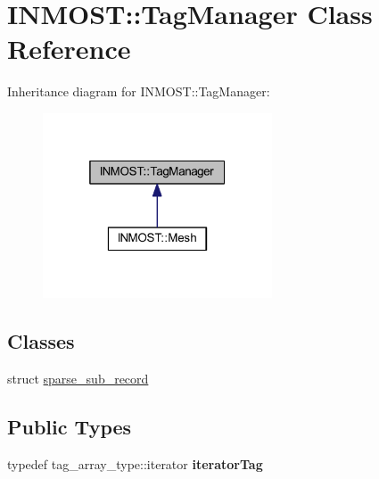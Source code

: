 \hypertarget{classINMOST_1_1TagManager}{\section{I\-N\-M\-O\-S\-T\-:\-:Tag\-Manager Class Reference}
\label{classINMOST_1_1TagManager}
}


Inheritance diagram for I\-N\-M\-O\-S\-T\-:\-:Tag\-Manager\-:
\nopagebreak
\begin{figure}[H]
\begin{center}
\leavevmode
\includegraphics[width=193pt]{classINMOST_1_1TagManager__inherit__graph}
\end{center}
\end{figure}
\subsection*{Classes}
\begin{DoxyCompactItemize}
\item 
struct \hyperlink{structINMOST_1_1TagManager_1_1sparse__sub__record}{sparse\-\_\-sub\-\_\-record}
\end{DoxyCompactItemize}
\subsection*{Public Types}
\begin{DoxyCompactItemize}
\item 
\hypertarget{classINMOST_1_1TagManager_adda9f59b50509dee56fa03697e1b4b02}{typedef tag\-\_\-array\-\_\-type\-::iterator {\bfseries iterator\-Tag}}\label{classINMOST_1_1TagManager_adda9f59b50509dee56fa03697e1b4b02}

\end{DoxyCompactItemize}
